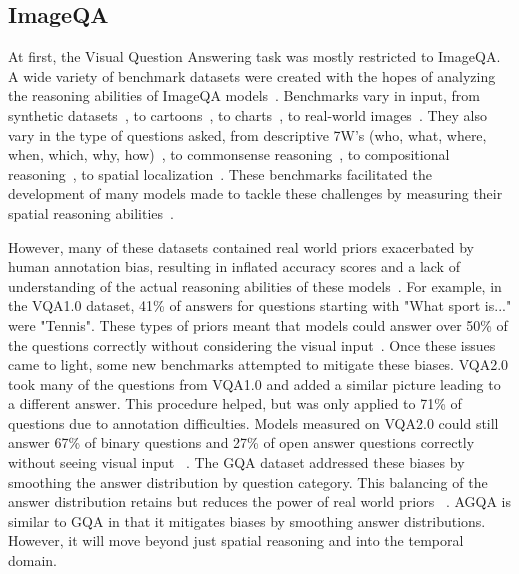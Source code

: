 \documentclass[10pt,twocolumn,letterpaper]{article}
\newcommand{\mgm}[1]{{\color{cyan}{mgm: #1}}}
\begin{document}
\subsection{ImageQA}

At first, the Visual Question Answering task was mostly restricted to ImageQA. A wide variety of benchmark datasets were created with the hopes of analyzing the reasoning abilities of ImageQA models~\cite{johnson2017clevr,hudson2019gqa,antol2015vqa,zellers2019recognition,goyal2017making,krishna2017visual,zhu2016visual7w,kim2020answering}. Benchmarks vary in input, from synthetic datasets~\cite{johnson2017clevr}, to cartoons~\cite{antol2015vqa}, to charts~\cite{kim2017deepstory}, to real-world images~\cite{hudson2019gqa,krishna2017visual,zhu2016visual7w,goyal2017making,zellers2019recognition,antol2015vqa}. They also vary in the type of questions asked, from descriptive 7W's (who, what, where, when, which, why, how)~\cite{zhu2016visual7w}, to commonsense reasoning~\cite{zellers2019recognition}, to compositional reasoning~\cite{johnson2017clevr,hudson2019gqa}, to spatial localization~\cite{zhu2016visual7w,krishna2017visual,hudson2019gqa}. These benchmarks facilitated the development of many models made to tackle these challenges by measuring their spatial reasoning abilities~\cite{johnson2017clevr,hudson2019gqa,krishna2017visual,vatashsky2020vqa}. \mgm{replace these citations}%

However, many of these datasets contained real world priors exacerbated by human annotation bias, resulting in inflated accuracy scores and a lack of understanding of the actual reasoning abilities of these models~\cite{goyal2017making,hudson2019gqa}. For example, in the VQA1.0 dataset, 41\% of answers  for questions starting with "What sport is..." were "Tennis". These types of priors meant that models could answer over 50\% of the questions correctly without considering the visual input~\cite{goyal2017making}. Once these issues came to light, some new benchmarks attempted to mitigate these biases. VQA2.0 took many of the questions from VQA1.0 and added a similar picture leading to a different answer. This procedure helped, but was only applied to 71\% of questions due to annotation difficulties. Models measured on VQA2.0 could still answer 67\% of binary questions and 27\% of open answer questions correctly without seeing visual input~\cite{hudson2019gqa} \mgm{our open answer blind model is similar.. so this point is less salient unless we can bring that down}. The GQA dataset addressed these biases by smoothing the answer distribution by question category. This balancing of the answer distribution retains but reduces the power of real world priors ~\cite{hudson2019gqa}. AGQA is similar to GQA in that it mitigates biases by smoothing answer distributions. However, it will move beyond just spatial reasoning and into the temporal domain. 
\end{document}
